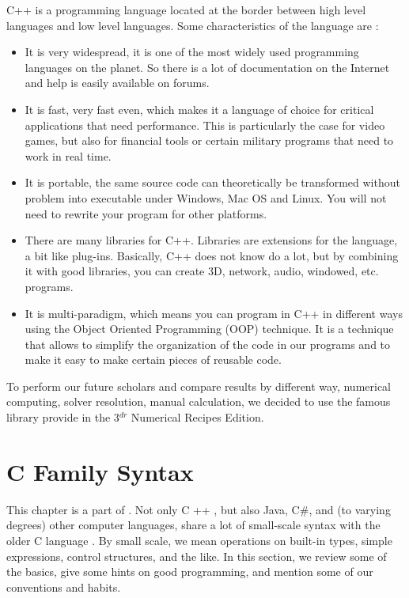\documentclass[12pt]{report}
\begin{document}
C++ is a programming language located at the border between high level languages and low level languages. Some characteristics of the language are \cite{progcpp}: 

\begin{itemize}
    \item  It is very widespread, it is one of the most widely used programming languages on the planet. So there is a lot of documentation on the Internet and help is easily available on forums. 

    \item It is fast, very fast even, which makes it a language of choice for critical applications that need performance. This is particularly the case for video games, but also for financial tools or certain military programs that need to work in real time.

    \item It is portable, the same source code can theoretically be transformed without problem into executable under Windows, Mac OS and Linux. You will not need to rewrite your program for other platforms.

    \item There are many libraries for C++. Libraries are extensions for the language, a bit like plug-ins. Basically, C++ does not know do a lot, but by combining it with good libraries, you can create 3D, network, audio, windowed, etc. programs.

    \item It is multi-paradigm, which means you can program in C++ in different ways using the Object Oriented Programming (OOP) technique. It is a technique that allows to simplify the organization of the code in our programs and to make it easy to make certain pieces of reusable code.
\end{itemize}


To perform our future scholars and compare results by different way, numerical computing, solver resolution, manual calculation, we decided to use the famous library provide in the 3\(^{dr}\) Numerical Recipes Edition\cite{nr3ed}.


\newpage
\chapter{C Family Syntax}

This chapter is a part of \cite{nr3ed}. Not only C ++ , but also Java, C\#, and (to varying degrees) other computer languages, share a lot of small-scale syntax with the older C language \cite{cppstdlib}. By small scale, we mean operations on built-in types, simple expressions, control structures,
and the like. In this section, we review some of the basics, give some hints on good
programming, and mention some of our conventions and habits.
\end{document}
